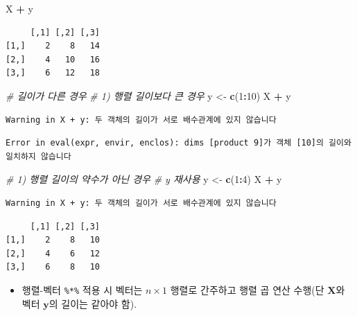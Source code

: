\documentclass[
  11pt,
]{krantz}
\newenvironment{Shaded}{\begin{snugshade}}{\end{snugshade}}
\newcommand{\CommentTok}[1]{\textcolor[rgb]{0.37,0.37,0.37}{\textit{#1}}}
\newcommand{\DecValTok}[1]{\textcolor[rgb]{0.06,0.06,0.06}{#1}}
\newcommand{\KeywordTok}[1]{\textcolor[rgb]{0.27,0.27,0.27}{\textbf{#1}}}
\newcommand{\NormalTok}[1]{#1}
\newcommand{\OperatorTok}[1]{\textcolor[rgb]{0.43,0.43,0.43}{\textbf{#1}}}
\newcommand{\StringTok}[1]{\textcolor[rgb]{0.5,0.5,0.5}{#1}}
\providecommand{\tightlist}{%
  \setlength{\itemsep}{0pt}\setlength{\parskip}{0pt}}
\begin{document}
\begin{Shaded}
\begin{Highlighting}[]
\NormalTok{X }\OperatorTok{+}\StringTok{ }\NormalTok{y}
\end{Highlighting}
\end{Shaded}

\begin{verbatim}
     [,1] [,2] [,3]
[1,]    2    8   14
[2,]    4   10   16
[3,]    6   12   18
\end{verbatim}

\begin{Shaded}
\begin{Highlighting}[]
\CommentTok{# 길이가 다른 경우}
\CommentTok{# 1) 행렬 길이보다 큰 경우}
\NormalTok{y <-}\StringTok{ }\KeywordTok{c}\NormalTok{(}\DecValTok{1}\OperatorTok{:}\DecValTok{10}\NormalTok{)}
\NormalTok{X }\OperatorTok{+}\StringTok{ }\NormalTok{y}
\end{Highlighting}
\end{Shaded}

\begin{verbatim}
Warning in X + y: 두 객체의 길이가 서로 배수관계에 있지 않습니다
\end{verbatim}

\begin{verbatim}
Error in eval(expr, envir, enclos): dims [product 9]가 객체 [10]의 길이와 일치하지 않습니다
\end{verbatim}

\begin{Shaded}
\begin{Highlighting}[]
\CommentTok{# 1) 행렬 길이의 약수가 아닌 경우}
\CommentTok{# y 재사용}
\NormalTok{y <-}\StringTok{ }\KeywordTok{c}\NormalTok{(}\DecValTok{1}\OperatorTok{:}\DecValTok{4}\NormalTok{)}
\NormalTok{X }\OperatorTok{+}\StringTok{ }\NormalTok{y}
\end{Highlighting}
\end{Shaded}

\begin{verbatim}
Warning in X + y: 두 객체의 길이가 서로 배수관계에 있지 않습니다
\end{verbatim}

\begin{verbatim}
     [,1] [,2] [,3]
[1,]    2    8   10
[2,]    4    6   12
[3,]    6    8   10
\end{verbatim}

\normalsize

\begin{itemize}
\tightlist
\item
  행렬-벡터 \texttt{\%*\%} 적용 시 벡터는 \(n \times 1\) 행렬로 간주하고 행렬 곱 연산 수행(단 \(\mathrm{\mathbf X}\)와 벡터 \(\mathrm{\mathbf y}\)의 길이는 같아야 함).
\end{itemize}
\end{document}
